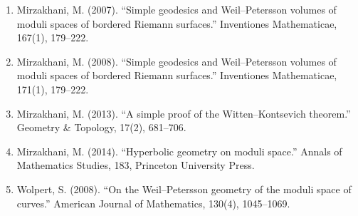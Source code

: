 \begin{enumerate}
\item Mirzakhani, M. (2007). ``Simple geodesics and Weil--Petersson volumes of moduli spaces of bordered Riemann surfaces.'' Inventiones Mathematicae, 167(1), 179--222.
\item Mirzakhani, M. (2008). ``Simple geodesics and Weil--Petersson volumes of moduli spaces of bordered Riemann surfaces.'' Inventiones Mathematicae, 171(1), 179--222.
\item Mirzakhani, M. (2013). ``A simple proof of the Witten--Kontsevich theorem.'' Geometry \& Topology, 17(2), 681--706.
\item Mirzakhani, M. (2014). ``Hyperbolic geometry on moduli space.'' Annals of Mathematics Studies, 183, Princeton University Press.
\item Wolpert, S. (2008). ``On the Weil--Petersson geometry of the moduli space of curves.'' American Journal of Mathematics, 130(4), 1045--1069.
\end{enumerate}